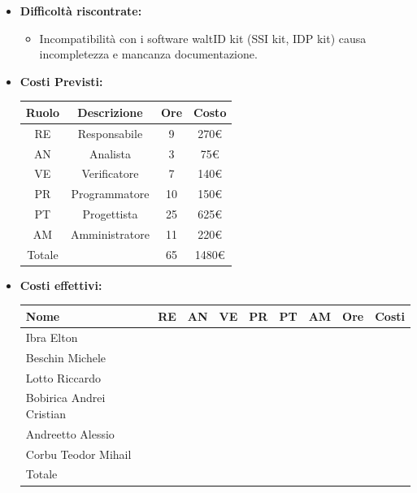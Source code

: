 \begin{itemize}
\begin{itemize}
        \end{itemize}
        \item \textbf{Difficoltà riscontrate:}
        \begin{itemize}
            \item Incompatibilità con i software waltID kit (SSI kit, IDP kit) causa incompletezza e mancanza documentazione.
        \end{itemize}
        \item \textbf{Costi Previsti:}
        \begin{longtable}{|c|c|c|c|}
            \hline
            Ruolo & Descrizione & Ore & Costo \\
            \hline
            RE & Responsabile & 9 & 270€\\
            \hline
            AN & Analista & 3 &  75€\\
            \hline
            VE & Verificatore & 7 &  140€\\
            \hline
            PR & Programmatore & 10 & 150€ \\
            \hline
            PT & Progettista & 25 &  625€\\
            \hline
            AM & Amministratore & 11 &  220€\\
            \hline
            Totale & &  65&  1480€\\
            \hline
            \end{longtable}
        \item \textbf{Costi effettivi:}
        \begin{longtable}{|p{}|c|c|c|c|c|c|c|c|}
            \hline
            Nome & RE & AN & VE & PR & PT & AM & Ore & Costi\\
            \hline
            Ibra \newline Elton & & & & & & & & \\
            \hline
            Beschin Michele & & & & & & & & \\
            \hline
            Lotto \newline Riccardo & & & & & & & & \\
            \hline
            Bobirica Andrei Cristian & & & & & & & & \\
            \hline
            Andreetto Alessio & & & & & & & & \\
            \hline
            Corbu Teodor Mihail & & & & & & & & \\
            \hline
            Totale & & & & & & & & \\
            \hline
        \end{longtable}
        \end{itemize}

